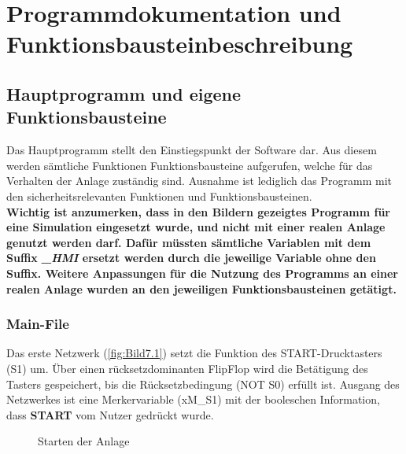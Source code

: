 \section{Programmdokumentation und Funktionsbausteinbeschreibung}

\subsection{Hauptprogramm und eigene Funktionsbausteine}

Das Hauptprogramm stellt den Einstiegspunkt der Software dar. Aus diesem werden sämtliche Funktionen \bzw Funktionsbausteine aufgerufen, welche für das Verhalten der Anlage zuständig sind. Ausnahme ist lediglich das Programm mit den sicherheitsrelevanten Funktionen und Funktionsbausteinen.\\
\textbf{Wichtig ist anzumerken, dass in den Bildern gezeigtes Programm für eine Simulation eingesetzt wurde, und nicht mit einer realen Anlage genutzt werden darf. Dafür müssten sämtliche Variablen mit dem Suffix \textit{\glqq \_HMI\grqq{}} ersetzt werden durch die jeweilige Variable ohne den Suffix. Weitere Anpassungen für die Nutzung des Programms an einer realen Anlage wurden an den jeweiligen Funktionsbausteinen getätigt.}

\subsubsection{Main-File}

Das erste Netzwerk (\autoref{fig:Bild7.1}) setzt die Funktion des START-Drucktasters (S1) um. Über einen rücksetzdominanten FlipFlop wird die Betätigung des Tasters gespeichert, bis die Rücksetzbedingung (NOT S0) erfüllt ist. Ausgang des Netzwerkes ist eine Merkervariable (xM\_S1) mit der booleschen Information, dass \textbf{START} vom Nutzer gedrückt wurde.

\begin{figure}[H]
   \centering
   \caption[Starten der Anlage]{Starten der Anlage}
   \label{fig:Bild7.1}
\end{figure}

